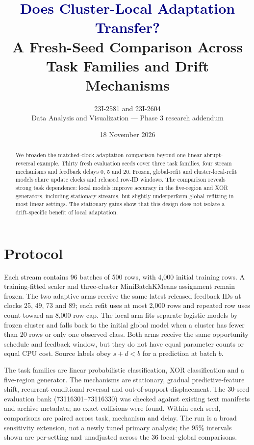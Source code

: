 \documentclass[10pt]{article}
\title{\textcolor{navy}{Does Cluster-Local Adaptation Transfer?}\\[3pt]
\large A Fresh-Seed Comparison Across Task Families and Drift Mechanisms}
\author{23I-2581 and 23I-2604\\Data Analysis and Visualization --- Phase 3 research addendum}
\date{18 November 2026}
\begin{document}
\maketitle
\begin{abstract}
We broaden the matched-clock adaptation comparison beyond one linear abrupt-reversal example. Thirty fresh evaluation seeds cover three task families, four stream mechanisms and feedback delays 0, 5 and 20. Frozen, global-refit and cluster-local-refit models share update clocks and released row-ID windows. The comparison reveals strong task dependence: local models improve accuracy in the five-region and XOR generators, including stationary streams, but slightly underperform global refitting in most linear settings. The stationary gains show that this design does not isolate a drift-specific benefit of local adaptation.
\end{abstract}
\section{Protocol}
Each stream contains 96 batches of 500 rows, with 4,000 initial training rows. A training-fitted scaler and three-cluster MiniBatchKMeans assignment remain frozen. The two adaptive arms receive the same latest released feedback IDs at clocks 25, 49, 73 and 89; each refit uses at most 2,000 rows and repeated row uses count toward an 8,000-row cap. The local arm fits separate logistic models by frozen cluster and falls back to the initial global model when a cluster has fewer than 20 rows or only one observed class. Both arms receive the same opportunity schedule and feedback window, but they do not have equal parameter counts or equal CPU cost. Source labels obey $s+d<b$ for a prediction at batch $b$.

The task families are linear probabilistic classification, XOR classification and a five-region generator. The mechanisms are stationary, gradual predictive-feature shift, recurrent conditional reversal and out-of-support displacement. The 30-seed evaluation bank (73116301--73116330) was checked against existing text manifests and archive metadata; no exact collisions were found. Within each seed, comparisons are paired across task, mechanism and delay. The run is a broad sensitivity extension, not a newly tuned primary analysis; the 95\% intervals shown are per-setting and unadjusted across the 36 local--global comparisons.
\end{document}
